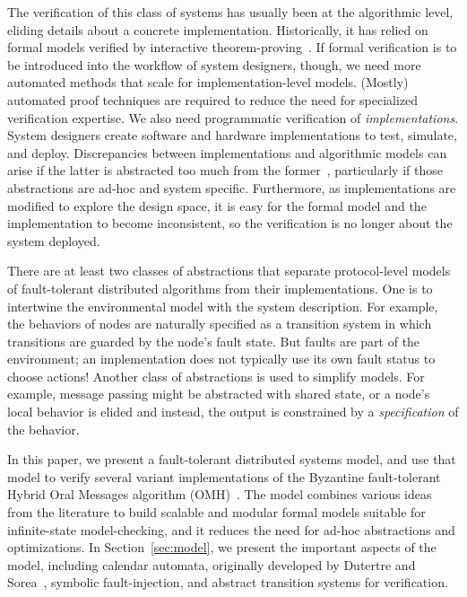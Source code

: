 \documentclass{llncs/llncs}
\newcommand{\OMH}{\ensuremath{\mathrm{OMH}}\xspace}
\begin{document}
The verification of this class of systems has usually been at the algorithmic level, eliding details about a concrete implementation. Historically, it has relied on formal models verified by interactive theorem-proving~\cite{om-acl2-impl,Young97:IC,Lincoln-Rushby,pvs}. If formal verification is to be introduced into the workflow of system designers, though, we need more automated methods that scale for implementation-level models. (Mostly) automated proof techniques are required to reduce the need for specialized verification expertise. We also need programmatic verification of \emph{implementations}. System designers create software and hardware implementations to test, simulate, and deploy. Discrepancies between implementations and algorithmic models can arise if the latter is abstracted too much from the former~\cite{paxos}, particularly if those abstractions are ad-hoc and system specific. Furthermore, as implementations are modified to explore the design space, it is easy for the formal model and the implementation to become inconsistent, so the verification is no longer about the system deployed.

There are at least two classes of abstractions that separate protocol-level models of fault-tolerant distributed algorithms from their implementations.  One is to intertwine the environmental model with the system description. For example, the behaviors of nodes are naturally specified as a transition system in which transitions are guarded by the node's fault state. But faults are part of the environment; an implementation does not typically use its own fault status to choose actions! Another class of abstractions is used to simplify models.  For example, message passing might be abstracted with shared state, or a node's local behavior is elided and instead, the output is constrained by a \emph{specification} of the behavior.

In this paper, we present a fault-tolerant distributed systems model, and use that model to verify several variant implementations of the Byzantine fault-tolerant Hybrid Oral Messages algorithm (\OMH)~\cite{Lincoln-Rushby}. The model combines various ideas from the literature to build scalable and modular formal models suitable for infinite-state model-checking, and it reduces the need for ad-hoc abstractions and optimizations. In Section~\ref{sec:model}, we present the important aspects of the model, including calendar automata, originally developed by Dutertre and Sorea~\cite{cal}, symbolic fault-injection, and abstract transition systems for verification.
\end{document}
